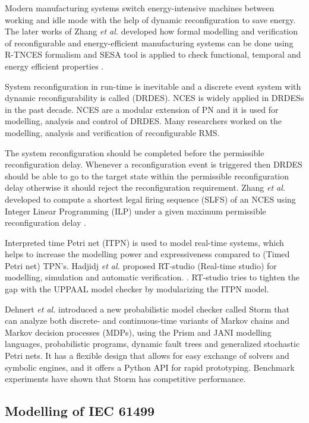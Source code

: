 \begin{bibunit}
Modern manufacturing systems switch energy-intensive machines between working and idle mode with the help of dynamic reconfiguration to save energy. The later works of Zhang \textit{et al.} developed how formal modelling and verification of reconfigurable and energy-efficient manufacturing systems can be done using R-TNCES formalism and SESA tool is applied to check functional, temporal and energy efficient properties \cite{zhang2015modeling,zhang2018simulation}.

System reconfiguration in run-time is inevitable and a discrete event system with dynamic reconfigurability is called (DRDES). NCES is widely applied in DRDESs in the past decade. NCES are a modular extension of PN and it is used for modelling, analysis and control of DRDES. Many researchers worked on the modelling, analysis and verification of reconfigurable RMS. 

The system reconfiguration should be completed before the permissible reconfiguration delay. Whenever a reconfiguration event is triggered then DRDES should be able to go to the target state within the permissible reconfiguration delay otherwise it should reject the reconfiguration requirement. Zhang \textit{et al.} developed to compute a shortest legal firing sequence (SLFS) of an NCES using Integer Linear Programming (ILP) under a given maximum permissible reconfiguration delay \cite{zhang2018shortest}.

Interpreted time Petri net (ITPN) is used to model real-time systems, which helps to increase the modelling power and expressiveness compared to (Timed Petri net) TPN's. Hadjidj \textit{et al.} proposed  RT-studio (Real-time studio) for  modelling, simulation and automatic verification. \cite{hadjidj2013rt}. RT-studio tries to tighten the gap with the UPPAAL model checker by modularizing the ITPN model.  

Dehnert \textit{et al.} introduced a new probabilistic model checker \cite{dehnert2017storm, hensel2022probabilistic} called Storm that can analyze both discrete- and continuous-time variants of Markov chains and Markov decision processes  (MDPs), using the Prism and JANI modelling languages, probabilistic programs, dynamic fault trees and generalized stochastic Petri nets. It has a flexible design that allows for easy exchange of solvers and symbolic engines, and it offers a Python API for rapid prototyping. Benchmark experiments have shown that Storm has competitive performance.

\subsection{Modelling of IEC 61499}\label{sec:mod61499}


\end{bibunit}
